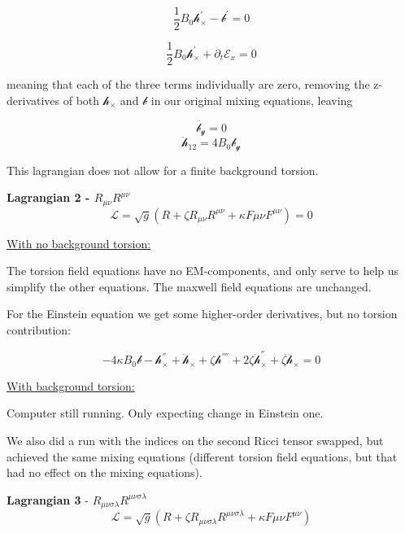 \documentclass[letterpaper,12pt]{article}
\begin{document}
\begin{equation}
\frac{1}{2} B_0 \mathcal{h}_{\times}^{'}-\mathcal{b}^{'}=0
\end{equation}

\begin{equation}
\frac{1}{2} B_0 \mathcal{h}_{\times}^{'}+\partial_t \mathcal{E}_x=0
\end{equation}

meaning that each of the three terms individually are zero, removing the z-derivatives of both $\mathcal{h}_{\times}$ and $\mathcal{b}$ in our original mixing equations, leaving

\begin{equation}
\ddot{ \mathcal{b_y}}=0
\end{equation}
\begin{equation}
\ddot{ \mathcal{h}}_{12} =4B_0 \mathcal{b_y}
\end{equation}


This lagrangian does not allow for a finite background torsion.



\textbf{Lagrangian 2 - $R_{\mu \nu} R^{\mu \nu}$}
\begin{equation}
\mathcal{L}=\sqrt{g}(R+\zeta R_{\mu \nu} R^{\mu \nu}+\kappa F{\mu \nu}F^{\mu \nu})=0
\end{equation}

\underline{With no background torsion:}

The torsion field equations have no EM-components, and only serve to help us simplify the other equations.
The maxwell field equations are unchanged. 

For the Einstein equation we get some higher-order derivatives, but no torsion contribution:

\begin{equation}
-4 \kappa B_0 \mathcal{b}-\mathcal{h}_{\times}^{''}+\ddot{\mathcal{h}}_{\times}+\zeta \mathcal{h}^{''''}+2  \zeta \ddot{\mathcal{h}}_{\times}^{''}+\zeta \ddddot{\mathcal{h}}_{\times}=0
\end{equation}


\underline{With background torsion:}

Computer still running. Only expecting change in Einstein one.


We also did a run with the indices on the second Ricci tensor swapped, but achieved the same mixing equations (different torsion field equations, but that had no effect on the mixing equations).


\textbf{Lagrangian 3} - $ R_{\mu \nu \sigma \lambda} R^{\mu \nu \sigma \lambda}$
\begin{equation}
\mathcal{L}=\sqrt{g}(R+\zeta R_{\mu \nu \sigma \lambda} R^{\mu \nu \sigma \lambda}+\kappa F{\mu \nu}F^{\mu \nu})
\end{equation}
\end{document}

